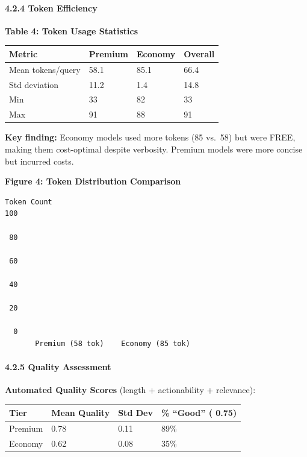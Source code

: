 \hypertarget{token-efficiency}{%
\paragraph{4.2.4 Token Efficiency}\label{token-efficiency}}

\textbf{Table 4: Token Usage Statistics}

\begin{longtable}[]{@{}llll@{}}
\toprule
Metric & Premium & Economy & Overall \\
\midrule
\endhead
Mean tokens/query & 58.1 & 85.1 & 66.4 \\
Std deviation & 11.2 & 1.4 & 14.8 \\
Min & 33 & 82 & 33 \\
Max & 91 & 88 & 91 \\
\bottomrule
\end{longtable}

\textbf{Key finding:} Economy models used more tokens (85 vs.~58) but
were FREE, making them cost-optimal despite verbosity. Premium models
were more concise but incurred costs.

\textbf{Figure 4: Token Distribution Comparison}

\begin{verbatim}
Token Count
100              
                              
 80                           
                              
 60                           
                              
 40                           
                              
 20                           
                              
  0                                
       Premium (58 tok)    Economy (85 tok)
\end{verbatim}

\hypertarget{quality-assessment}{%
\paragraph{4.2.5 Quality Assessment}\label{quality-assessment}}

\textbf{Automated Quality Scores} (length + actionability + relevance):

\begin{longtable}[]{@{}llll@{}}
\toprule
Tier & Mean Quality & Std Dev & \% ``Good'' ( 0.75) \\
\midrule
\endhead
Premium & 0.78 & 0.11 & 89\% \\
Economy & 0.62 & 0.08 & 35\% \\
\bottomrule
\end{longtable}

